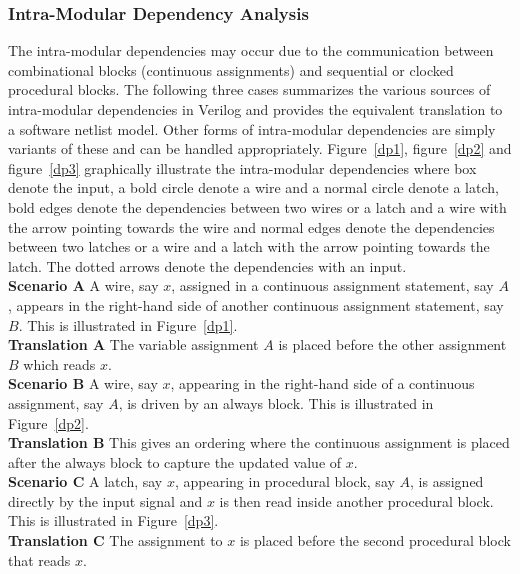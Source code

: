 \subsubsection{Intra-Modular Dependency Analysis}
%
The intra-modular dependencies may occur due to the communication between
combinational blocks (continuous assignments) and sequential or clocked 
procedural blocks.  The following three cases summarizes the various sources of 
intra-modular dependencies in Verilog and provides the equivalent translation 
to a software netlist model.  Other forms of intra-modular dependencies are 
simply variants of these and can be handled appropriately.
Figure~\ref{dp1}, figure~\ref{dp2} and figure~\ref{dp3} graphically 
illustrate the intra-modular dependencies
where box denote the input, a bold circle denote a wire and a normal circle
denote a latch, bold edges denote the dependencies between two wires or a latch 
and a wire with the arrow pointing towards the wire and normal edges denote the 
dependencies between two latches or a wire and a latch with the arrow pointing
towards the latch. The dotted arrows denote the dependencies with an input.
\\
%
\noindent \textbf{Scenario A}  A wire, say $x$,  assigned in a continuous assignment 
statement, say $A$, appears in the right-hand side of another continuous assignment 
statement, say $B$.  This is illustrated in Figure~\ref{dp1}.\\

\noindent \textbf{Translation A} The variable assignment $A$ is placed before the other assignment $B$ 
which reads $x$.  \\

\noindent \textbf{Scenario B} A wire, say $x$, appearing in the right-hand side of a 
continuous assignment, say $A$, is driven by an always block.  This is illustrated in 
Figure~\ref{dp2}.\\

\noindent \textbf{Translation B} This gives an ordering where the continuous assignment is 
placed after the always block to capture the updated value of $x$. \\

\noindent \textbf{Scenario C} A latch, say $x$, appearing in procedural block, 
say $A$, is assigned directly by the input signal and $x$ is then read inside 
another procedural block. This is illustrated in Figure~\ref{dp3}.\\

\noindent \textbf{Translation C} The assignment to $x$ is placed before the second 
procedural block that reads $x$.\\

